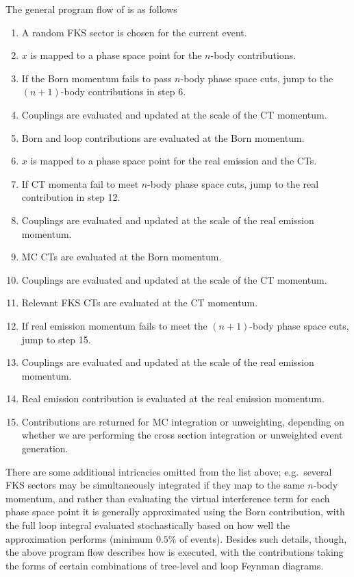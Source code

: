 \documentclass[a4paper,11pt]{article}
\begin{document}
The general program flow of \sigintf is as follows

\begin{enumerate}
    \item A random FKS sector is chosen for the current event.
    \item $x$ is mapped to a phase space point for the $n$-body contributions.
    \item If the Born momentum fails to pass $n$-body phase space cuts, jump to the $(n+1)$-body contributions in step 6.
    \item Couplings are evaluated and updated at the scale of the CT momentum.
    \item Born and loop contributions are evaluated at the Born momentum.
    \item $x$ is mapped to a phase space point for the real emission and the CTs.
    \item If CT momenta fail to meet $n$-body phase space cuts, jump to the real contribution in step 12.
    \item Couplings are evaluated and updated at the scale of the real emission momentum.
    \item MC CTs are evaluated at the Born momentum.
    \item Couplings are evaluated and updated at the scale of the CT momentum.
    \item Relevant FKS CTs are evaluated at the CT momentum.
    \item If real emission momentum fails to meet the $(n+1)$-body phase space cuts, jump to step 15.
    \item Couplings are evaluated and updated at the scale of the real emission momentum.
    \item Real emission contribution is evaluated at the real emission momentum.
    \item Contributions are returned for MC integration or unweighting, depending on whether we are performing the cross section integration or unweighted event generation.
\end{enumerate}

There are some additional intricacies omitted from the list above; e.g.\ several FKS sectors may be simultaneously integrated if they map to the same $n$-body momentum, and rather than evaluating the virtual interference term for each phase space point it is generally approximated using the Born contribution, with the full loop integral evaluated stochastically based on how well the approximation performs (minimum $0.5$\% of events). Besides such details, though, the above program flow describes how \sigintf is executed, with the contributions taking the forms of certain combinations of tree-level and loop Feynman diagrams.
\end{document}
